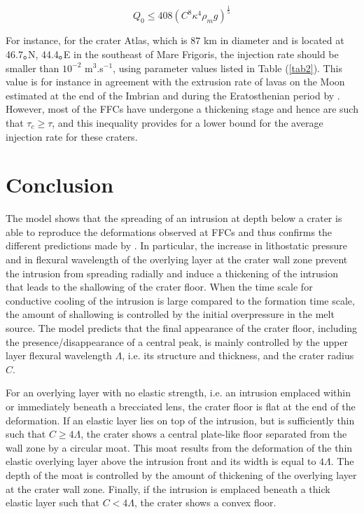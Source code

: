 \begin{article}
\begin{equation}
  Q_{0}\le408 (C^{8}\kappa^{4}\rho_{m}g)^{\frac{1}{5}}
  \label{eq5-3}
\end{equation}

For instance, for  the crater Atlas, which is $87$  km in diameter and
is located  at 46.7｡N, 44.4｡E in  the southeast of Mare  Frigoris, the
injection  rate should  be  smaller  than $10^{-2}$  m$^{3}$.s$^{-1}$,
using parameter values listed in Table (\ref{tab2}). This value is for
instance in  agreement with the  extrusion rate  of lavas on  the Moon
estimated  at the  end of  the  Imbrian and  during the  Eratosthenian
period by \citet{Head1992a}. However, most  of the FFCs have undergone
a thickening  stage and hence are  such that $\tau_{c} \ge  \tau$, and
this inequality provides  for a lower bound for  the average injection
rate for these craters.
 		
\section{Conclusion}
		
The model  shows that the spreading  of an intrusion at  depth below a
crater is able to reproduce the deformations observed at FFCs and thus
confirms  the different  predictions made  by \citet{Schultz1976}.  In
particular,  the  increase in  lithostatic  pressure  and in  flexural
wavelength of the overlying layer at  the crater wall zone prevent the
intrusion  from spreading  radially  and induce  a  thickening of  the
intrusion that leads  to the shallowing of the crater  floor. When the
time scale for  conductive cooling of the intrusion  is large compared
to the formation time scale, the amount of shallowing is controlled by
the initial overpressure  in the melt source. The  model predicts that
the   final   appearance   of   the  crater   floor,   including   the
presence/disappearance of a central peak,  is mainly controlled by the
upper  layer flexural  wavelength  $\Lambda$, i.e.  its structure  and
thickness, and the crater radius $C$.
	
For an  overlying layer  with no elastic  strength, i.e.  an intrusion
emplaced within or  immediately beneath a brecciated  lens, the crater
floor is flat at the end of  the deformation. If an elastic layer lies
on  top  of  the  intrusion,   but  is  sufficiently  thin  such  that
$C\ge 4\Lambda$, the crater shows a central plate-like floor separated
from the  wall zone by  a circular moat.   This moat results  from the
deformation of  the thin elastic  overlying layer above  the intrusion
front and its width  is equal to $4\Lambda$. The depth  of the moat is
controlled by the  amount of thickening of the overlying  layer at the
crater  wall zone.  Finally, if  the intrusion  is emplaced  beneath a
thick elastic layer such that $C< 4\Lambda$, the crater shows a convex
floor.


\end{article}
